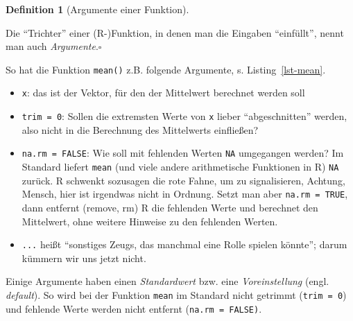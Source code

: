 \documentclass[
  a4paper,
]{scrbook}
\newenvironment{Shaded}{\begin{snugshade}}{\end{snugshade}}
\newcommand{\AttributeTok}[1]{\textcolor[rgb]{0.40,0.45,0.13}{#1}}
\newcommand{\ConstantTok}[1]{\textcolor[rgb]{0.56,0.35,0.01}{#1}}
\newcommand{\DecValTok}[1]{\textcolor[rgb]{0.68,0.00,0.00}{#1}}
\newcommand{\FunctionTok}[1]{\textcolor[rgb]{0.28,0.35,0.67}{#1}}
\newcommand{\NormalTok}[1]{\textcolor[rgb]{0.00,0.23,0.31}{#1}}
\providecommand{\tightlist}{%
  \setlength{\itemsep}{0pt}\setlength{\parskip}{0pt}}\usepackage{longtable,booktabs,array}
\theoremstyle{definition}
\theoremstyle{definition}
\newtheorem{definition}{Definition}[chapter]
\theoremstyle{definition}
\theoremstyle{remark}
\begin{document}
\begin{definition}[Argumente einer
Funktion]\protect\hypertarget{def-args}{}\label{def-args}

Die ``Trichter'' einer (R-)Funktion, in denen man die Eingaben
``einfüllt'', nennt man auch \emph{Argumente}.\(\square\)

\end{definition}

So hat die Funktion \texttt{mean()} z.B. folgende Argumente, s.
Listing~\ref{lst-mean}.

\begin{codelisting}

\caption{\label{lst-mean}Die Argumente der R-Funktion \texttt{mean}}

\centering{

\begin{Shaded}
\begin{Highlighting}[]
\FunctionTok{mean}\NormalTok{(x, }\AttributeTok{trim =} \DecValTok{0}\NormalTok{, }\AttributeTok{na.rm =} \ConstantTok{FALSE}\NormalTok{, ...)}
\end{Highlighting}
\end{Shaded}

}

\end{codelisting}%

\begin{itemize}
\tightlist
\item
  \texttt{x}: das ist der Vektor, für den der Mittelwert berechnet
  werden soll
\item
  \texttt{trim\ =\ 0}: Sollen die extremsten Werte von \texttt{x} lieber
  ``abgeschnitten'' werden, also nicht in die Berechnung des Mittelwerts
  einfließen?
\item
  \texttt{na.rm\ =\ FALSE}: Wie soll mit fehlenden Werten \texttt{NA}
  umgegangen werden? Im Standard liefert \texttt{mean} (und viele andere
  arithmetische Funktionen in R) \texttt{NA} zurück. R schwenkt
  sozusagen die rote Fahne, um zu signalisieren, Achtung, Mensch, hier
  ist irgendwas nicht in Ordnung. Setzt man aber
  \texttt{na.rm\ =\ TRUE}, dann entfernt (remove, rm) R die fehlenden
  Werte und berechnet den Mittelwert, ohne weitere Hinweise zu den
  fehlenden Werten.
\item
  \texttt{...} heißt ``sonstiges Zeugs, das manchmal eine Rolle spielen
  könnte''; darum kümmern wir uns jetzt nicht.
\end{itemize}

Einige Argumente haben einen \emph{Standardwert} bzw. eine
\emph{Voreinstellung} (engl. \emph{default}). So wird bei der Funktion
\texttt{mean} im Standard nicht getrimmt (\texttt{trim\ =\ 0}) und
fehlende Werte werden nicht entfernt (\texttt{na.rm\ =\ FALSE)}.
\end{document}
